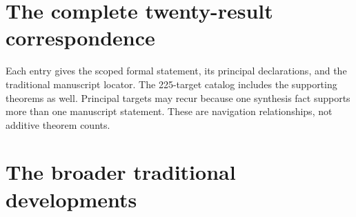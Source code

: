 

\usepackage{komorebi-publication}
\renewcommand{\KomorebiTitle}{Multiresolution Signal Calculus}
\renewcommand{\KomorebiSubtitle}{Exact coordinates, singular packets, and stable reconstruction}
\renewcommand{\KomorebiSeries}{Core series V}
\renewcommand{\KomorebiKind}{Lean and evidence guide}
\renewcommand{\KomorebiEdition}{Standardized publication edition / 8 October 2026}
\renewcommand{\KomorebiShortTitle}{Paper V}
\renewcommand{\KomorebiTitleSize}{38}
\renewcommand{\KomorebiTitleLeading}{43}
\renewcommand{\KomorebiProfile}{classical}
\renewcommand{\KomorebiOrientation}{portrait}
\KomorebiSetup

\KomorebiCover
{}


\setcounter{tocdepth}{1}
\tableofcontents
\clearpage

\clearpage
\clearpage
\clearpage
\clearpage
\clearpage
\clearpage
\clearpage
\clearpage
\section{The complete twenty-result correspondence}
\label{sec:ledger}
Each entry gives the scoped formal statement, its principal declarations, and the traditional manuscript locator. The 225-target catalog includes the supporting theorems as well. Principal targets may recur because one synthesis fact supports more than one manuscript statement. These are navigation relationships, not additive theorem counts.

\clearpage
\section{The broader traditional developments}
\label{sec:extension}


\clearpage
